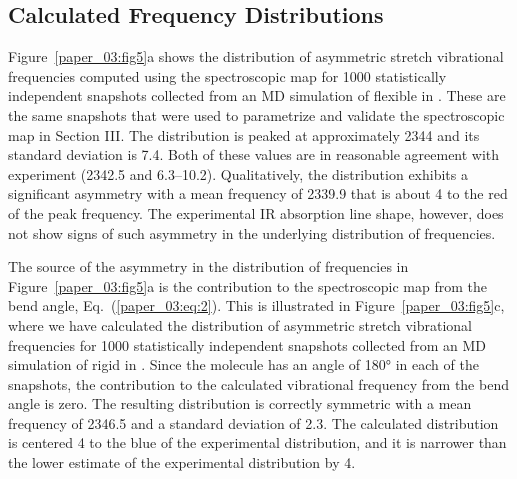 \documentclass[]{article}
\begin{document}
\subsection{Calculated Frequency Distributions}
\label{paper_03:ssec:V-B}

Figure~\ref{paper_03:fig5}a shows the distribution of  asymmetric stretch vibrational frequencies computed using the spectroscopic map for 1000 statistically independent snapshots collected from an MD simulation of flexible  in \ce{[C4C1im][PF6]}. These are the same snapshots that were used to parametrize and validate the spectroscopic map in Section III. The distribution is peaked at approximately \SI{2344}{\wavenumber} and its standard deviation is \SI{7.4}{\wavenumber}. Both of these values are in reasonable agreement with experiment (\SI{2342.5}{\wavenumber} and \SIrange{6.3}{10.2}{\wavenumber}). Qualitatively, the distribution exhibits a significant asymmetry with a mean frequency of \SI{2339.9}{\wavenumber} that is about \SI{4}{\wavenumber} to the red of the peak frequency. The experimental IR absorption line shape, however, does not show signs of such asymmetry in the underlying distribution of frequencies.

The source of the asymmetry in the distribution of frequencies in Figure~\ref{paper_03:fig5}a is the contribution to the spectroscopic map from the  bend angle, Eq.~(\ref{paper_03:eq:2}). This is illustrated in Figure~\ref{paper_03:fig5}c, where we have calculated the distribution of  asymmetric stretch vibrational frequencies for 1000 statistically independent snapshots collected from an MD simulation of rigid  in \ce{[C4C1im][PF6]}. Since the  molecule has an angle of \ang{180} in each of the snapshots, the contribution to the calculated vibrational frequency from the  bend angle is zero. The resulting distribution is correctly symmetric with a mean frequency of \SI{2346.5}{\wavenumber} and a standard deviation of \SI{2.3}{\wavenumber}. The calculated distribution is centered \SI{4}{\wavenumber} to the blue of the experimental distribution, and it is narrower than the lower estimate of the experimental distribution by \SI{4}{\wavenumber}.
\end{document}

